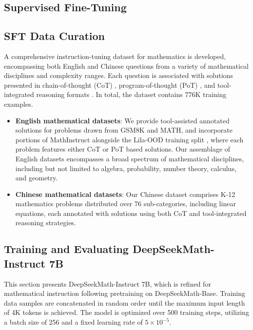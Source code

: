\begin{itemize}[topsep=0pt]
\section{Supervised Fine-Tuning}

\subsection{SFT Data Curation}

A comprehensive instruction-tuning dataset for mathematics is developed, encompassing both English and Chinese questions from a variety of mathematical disciplines and complexity ranges. Each question is associated with solutions presented in chain-of-thought (CoT) \citep{cot}, program-of-thought (PoT) \citep{pot,pal}, and tool-integrated reasoning formats \citep{tora}. In total, the dataset contains 776K training examples.

\begin{itemize}[topsep=0pt]
    \item \textbf{English mathematical datasets}: We provide tool-assisted annotated solutions for problems drawn from GSM8K and MATH, and incorporate portions of MathInstruct \citep{MathInstruct} alongside the Lila-OOD training split \citep{lila}, where each problem features either CoT or PoT based solutions. Our assemblage of English datasets encompasses a broad spectrum of mathematical disciplines, including but not limited to algebra, probability, number theory, calculus, and geometry.
    \item \textbf{Chinese mathematical datasets}: Our Chinese dataset comprises K-12 mathematics problems distributed over 76 sub-categories, including linear equations, each annotated with solutions using both CoT and tool-integrated reasoning strategies.
\end{itemize}

\subsection{Training and Evaluating DeepSeekMath-Instruct 7B}

This section presents DeepSeekMath-Instruct 7B, which is refined for mathematical instruction following pretraining on DeepSeekMath-Base. Training data samples are concatenated in random order until the maximum input length of 4K tokens is achieved. The model is optimized over 500 training steps, utilizing a batch size of 256 and a fixed learning rate of $5 \times 10^{-5}$.


\end{itemize}
